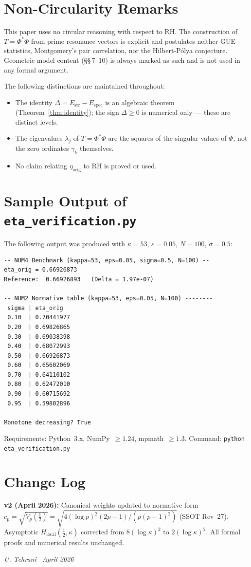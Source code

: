 \documentclass[11pt]{article}
\newcommand{\Estr}{E_{\mathrm{str}}}
\newcommand{\Espec}{E_{\mathrm{spec}}}
\newcommand{\etaorig}{\eta_{\mathrm{orig}}}
\newcommand{\Hlocal}{H_{\mathrm{local}}}
\begin{document}
\section{Non-Circularity Remarks}

This paper uses no circular reasoning with respect to RH\@. The construction
of $T=\Phi^*\Phi$ from prime resonance vectors is explicit and postulates
neither GUE statistics, Montgomery's pair correlation, nor the Hilbert-P\'olya
conjecture. Geometric model content (\S\S\,7--10) is always marked as such
and is not used in any formal argument.

The following distinctions are maintained throughout:
\begin{itemize}
\item The identity $\Delta=\Estr-\Espec$ is an algebraic theorem
(Theorem~\ref{thm:identity}); the sign $\Delta\geq 0$ is numerical only ---
these are distinct levels.
\item The eigenvalues $\lambda_j$ of $T=\Phi^*\Phi$ are the squares of the
singular values of $\Phi$, not the zero ordinates $\gamma_k$ themselves.
\item No claim relating $\etaorig$ to RH is proved or used.
\end{itemize}

\section{Sample Output of \texttt{eta\_verification.py}}

The following output was produced with $\kappa=53$, $\varepsilon=0.05$,
$N=100$, $\sigma=0.5$:

\begin{verbatim}
-- NUM4 Benchmark (kappa=53, eps=0.05, sigma=0.5, N=100) --
eta_orig = 0.66926873
Reference:  0.66926893   (Delta = 1.97e-07)

-- NUM2 Normative table (kappa=53, eps=0.05, N=100) --------
 sigma | eta_orig
 0.10  | 0.70441977
 0.20  | 0.69826865
 0.30  | 0.69038398
 0.40  | 0.68072993
 0.50  | 0.66926873
 0.60  | 0.65602069
 0.70  | 0.64110102
 0.80  | 0.62472010
 0.90  | 0.60715692
 0.95  | 0.59802896

Monotone decreasing? True
\end{verbatim}

Requirements: Python~3.x, NumPy~$\geq 1.24$, mpmath~$\geq 1.3$.
Command: \texttt{python eta\_verification.py}

\section*{Change Log}
\textbf{v2 (April 2026):}
Canonical weights updated to normative form
$c_p = \sqrt{V_p(\frac{1}{2})} = \sqrt{4(\log p)^2(2p-1)/(p(p-1)^2)}$ (SSOT Rev~27).
Asymptotic $\Hlocal(\frac{1}{2},\kappa)$
corrected from $8(\log\kappa)^2$ to $2(\log\kappa)^2$.
All formal proofs and numerical results unchanged.

\bigskip
\noindent\textit{U. Tehrani \textperiodcentered\ April 2026}
\end{document}
